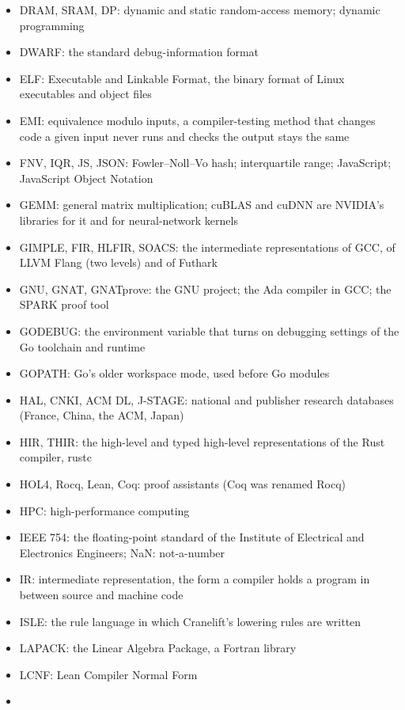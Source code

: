 \documentclass[10pt,letterpaper]{article}
\begin{document}
\begin{itemize}
  independent compiler and compares the bits
\item
  DRAM, SRAM, DP: dynamic and static random-access memory; dynamic
  programming
\item
  DWARF: the standard debug-information format
\item
  ELF: Executable and Linkable Format, the binary format of Linux
  executables and object files
\item
  EMI: equivalence modulo inputs, a compiler-testing method that changes
  code a given input never runs and checks the output stays the same
\item
  FNV, IQR, JS, JSON: Fowler--Noll--Vo hash; interquartile range;
  JavaScript; JavaScript Object Notation
\item
  GEMM: general matrix multiplication; cuBLAS and cuDNN are NVIDIA's
  libraries for it and for neural-network kernels
\item
  GIMPLE, FIR, HLFIR, SOACS: the intermediate representations of GCC, of
  LLVM Flang (two levels) and of Futhark
\item
  GNU, GNAT, GNATprove: the GNU project; the Ada compiler in GCC; the
  SPARK proof tool
\item
  GODEBUG: the environment variable that turns on debugging settings of
  the Go toolchain and runtime
\item
  GOPATH: Go's older workspace mode, used before Go modules
\item
  HAL, CNKI, ACM DL, J-STAGE: national and publisher research databases
  (France, China, the ACM, Japan)
\item
  HIR, THIR: the high-level and typed high-level representations of the
  Rust compiler, rustc
\item
  HOL4, Rocq, Lean, Coq: proof assistants (Coq was renamed Rocq)
\item
  HPC: high-performance computing
\item
  IEEE 754: the floating-point standard of the Institute of Electrical
  and Electronics Engineers; NaN: not-a-number
\item
  IR: intermediate representation, the form a compiler holds a program
  in between source and machine code
\item
  ISLE: the rule language in which Cranelift's lowering rules are
  written
\item
  LAPACK: the Linear Algebra Package, a Fortran library
\item
  LCNF: Lean Compiler Normal Form
\item

\end{itemize}
\end{document}
